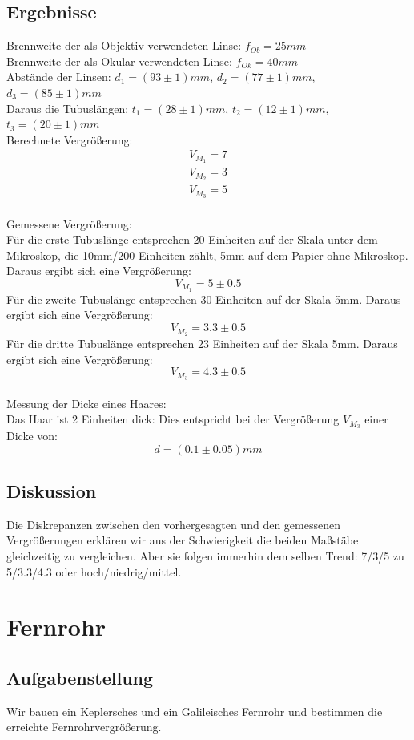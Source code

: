 \documentclass{article}
\begin{document}
\subsection{Ergebnisse}
Brennweite der als Objektiv verwendeten Linse: $f_{Ob}=25mm$\\
Brennweite der als Okular verwendeten Linse: $f_{Ok}=40mm$\\
Abstände der Linsen: $d_1=(93 \pm 1)mm$, $d_2=(77 \pm 1)mm$, $d_3=(85 \pm 1)mm$\\
Daraus die Tubuslängen: $t_1=(28 \pm 1)mm$, $t_2=(12 \pm 1)mm$, $t_3=(20 \pm 1)mm$ \\
Berechnete Vergrößerung: 
\begin{gather*}
V_{M_1}=7\\
V_{M_2}=3\\
V_{M_3}=5
\end{gather*}
\\
Gemessene Vergrößerung:\\
Für die erste Tubuslänge entsprechen 20 Einheiten auf der Skala  unter dem Mikroskop, die 10mm/200 Einheiten zählt, 5mm auf dem Papier ohne Mikroskop. Daraus ergibt sich eine Vergrößerung: $$\boxed{V_{M_1}=5 \pm 0.5}$$
Für die zweite Tubuslänge entsprechen 30 Einheiten auf der Skala  5mm. Daraus ergibt sich eine Vergrößerung: $$\boxed{V_{M_2}=3.3 \pm 0.5}$$
Für die dritte Tubuslänge entsprechen 23 Einheiten auf der Skala  5mm. Daraus ergibt sich eine Vergrößerung: $$\boxed{V_{M_3}=4.3 \pm 0.5}$$
\\
Messung der Dicke eines Haares:\\
Das Haar ist 2 Einheiten dick: Dies entspricht bei der Vergrößerung $V_{M_3}$ einer Dicke von: 
$$\boxed{d=(0.1 \pm 0.05)mm}$$
\subsection{Diskussion}
Die Diskrepanzen zwischen den vorhergesagten und den gemessenen Vergrößerungen erklären wir aus der Schwierigkeit die beiden Maßstäbe gleichzeitig zu vergleichen. Aber sie folgen immerhin dem selben Trend: 7/3/5 zu 5/3.3/4.3 oder hoch/niedrig/mittel. 
\section{Fernrohr}
\subsection{Aufgabenstellung}
Wir bauen ein Keplersches und ein Galileisches Fernrohr und bestimmen die erreichte Fernrohrvergrößerung.
\end{document}

